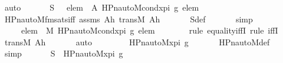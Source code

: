 \begin{isabellebody}
\ auto\isanewline
\ \ \isanewline
\ \ \isamarkupfalse%
\ {\isachardoublequoteopen}S\ {\isacharequal}{\kern0pt}\ {\isacharbraceleft}{\kern0pt}\ elem\ {\isasymin}\ A{\isachardot}{\kern0pt}\ HPn{\isacharunderscore}{\kern0pt}auto{\isacharunderscore}{\kern0pt}M{\isacharunderscore}{\kern0pt}cond{\isacharparenleft}{\kern0pt}x{\isacharunderscore}{\kern0pt}pi{\isacharcomma}{\kern0pt}\ g{\isacharcomma}{\kern0pt}\ elem{\isacharparenright}{\kern0pt}\ {\isacharbraceright}{\kern0pt}{\isachardoublequoteclose}\ \isanewline
\ \ \ \ \isamarkupfalse%
\ HPn{\isacharunderscore}{\kern0pt}auto{\isacharunderscore}{\kern0pt}M{\isacharunderscore}{\kern0pt}fm{\isacharunderscore}{\kern0pt}sats{\isacharunderscore}{\kern0pt}iff\ assms\ Ah\ transM\ Ah\ \isanewline
\ \ \ \ \isamarkupfalse%
\ S{\isacharunderscore}{\kern0pt}def\ \isanewline
\ \ \ \ \isamarkupfalse%
\ simp\ \isanewline
\ \ \isamarkupfalse%
\ \isamarkupfalse%
\ {\isachardoublequoteopen}{\isachardot}{\kern0pt}{\isachardot}{\kern0pt}{\isachardot}{\kern0pt}\ {\isacharequal}{\kern0pt}\ {\isacharbraceleft}{\kern0pt}\ \ elem\ {\isasymin}\ M{\isachardot}{\kern0pt}\ HPn{\isacharunderscore}{\kern0pt}auto{\isacharunderscore}{\kern0pt}M{\isacharunderscore}{\kern0pt}cond{\isacharparenleft}{\kern0pt}x{\isacharunderscore}{\kern0pt}pi{\isacharcomma}{\kern0pt}\ g{\isacharcomma}{\kern0pt}\ elem{\isacharparenright}{\kern0pt}\ {\isacharbraceright}{\kern0pt}{\isachardoublequoteclose}\ \isanewline
\ \ \ \ \isamarkupfalse%
\ {\isacharparenleft}{\kern0pt}rule\ equality{\isacharunderscore}{\kern0pt}iffI{\isacharsemicolon}{\kern0pt}\ rule\ iffI{\isacharparenright}{\kern0pt}\isanewline
\ \ \ \ \isamarkupfalse%
\ transM\ Ah\ \isanewline
\ \ \ \ \isamarkupfalse%
\ auto\ \isanewline
\ \ \isamarkupfalse%
\ \isamarkupfalse%
\ {\isachardoublequoteopen}{\isachardot}{\kern0pt}{\isachardot}{\kern0pt}{\isachardot}{\kern0pt}\ {\isacharequal}{\kern0pt}\ HPn{\isacharunderscore}{\kern0pt}auto{\isacharunderscore}{\kern0pt}M{\isacharparenleft}{\kern0pt}x{\isacharunderscore}{\kern0pt}pi{\isacharcomma}{\kern0pt}\ g{\isacharparenright}{\kern0pt}{\isachardoublequoteclose}\ \isanewline
\ \ \ \ \isamarkupfalse%
\ HPn{\isacharunderscore}{\kern0pt}auto{\isacharunderscore}{\kern0pt}M{\isacharunderscore}{\kern0pt}def\ \isamarkupfalse%
\ simp\ \isanewline
\ \ \isamarkupfalse%
\ \isamarkupfalse%
\ {\isachardoublequoteopen}S\ {\isacharequal}{\kern0pt}\ HPn{\isacharunderscore}{\kern0pt}auto{\isacharunderscore}{\kern0pt}M{\isacharparenleft}{\kern0pt}x{\isacharunderscore}{\kern0pt}pi{\isacharcomma}{\kern0pt}\ g{\isacharparenright}{\kern0pt}{\isachardoublequoteclose}\ \ \isamarkupfalse%

\end{isabellebody}
